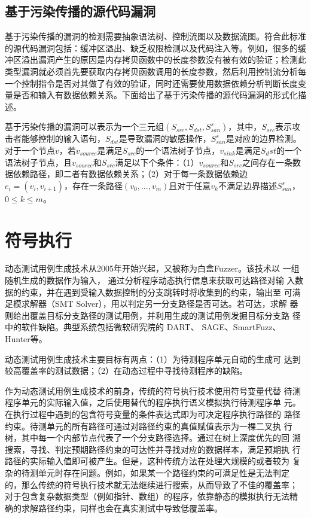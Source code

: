 \subsection{基于污染传播的源代码漏洞}

基于污染传播的漏洞的检测需要抽象语法树、控制流图以及数据流图。符合此标准的源代码漏洞包括：缓冲区溢出、缺乏权限检测以及代码注入等。例如，很多的缓冲区溢出漏洞产生的原因是内存拷贝函数中的长度参数没有被有效的验证；检测此类型漏洞就必须首先要获取内存拷贝函数调用的长度参数，然后利用控制流分析每一个控制指令是否对其做了有效的验证，同时还需要使用数据依赖分析判断长度变量是否和输入有数据依赖关系。下面给出了基于污染传播的源代码漏洞的形式化描述。

\begin{definition}
\label{基于污染传播的源代码漏洞描述}
基于污染传播的漏洞可以表示为一个三元组$(S_{src},S_{dst},S^{s}_{san})$，其中，$S_{src}$表示攻击者能够控制的输入语句，$S_{dst}$是导致漏洞的敏感操作，$S^{s}_{san}$是对应的边界检测。对于一个节点$v$，若$v_{source}$是满足$S_{src}$的一个语法树子节点，$v_{sink}$是满足$S_dst$的一个语法树子节点，且$v_{source}$和$S_{src}$满足以下个条件：（1）$v_{source}$和$S_{src}$之间存在一条数据依赖路径，即二者有数据依赖关系；（2）对于每一条数据依赖边$e_i = (v_i, v_{i+1})$，存在一条路径$(v_0,...,v_m)$且对于任意$v_k$不满足边界描述$S^{s}_{san}$，$0 \leq k \leq m$。
\end{definition}



\section{符号执行}
动态测试用例生成技术从2005年开始兴起，又被称为白盒Fuzzer。该技术以
一组随机生成的数据作为输入， 通过分析程序动态执行信息来获取可达路径对输
入数据的约束，并在遇到受输入数据控制的分支跳转时将收集到的约束，输出至
可满足模求解器（SMT Solver），用以判定另一分支路径是否可达。若可达，求解
器则给出覆盖目标分支路径的测试用例，并利用生成的测试用例发掘目标分支路
径中的软件缺陷。典型系统包括微软研究院的 DART、 SAGE、SmartFuzz、 Hunter等。

动态测试用例生成技术主要目标有两点：（1）为待测程序单元自动的生成可
达到较高覆盖率的测试数据；（2）在动态过程中寻找待测程序的缺陷。

作为动态测试用例生成技术的前身，传统的符号执行技术使用符号变量代替
待测程序单元的实际输入值，之后使用替代的程序执行语义模拟执行待测程序单
元。在执行过程中遇到的包含符号变量的条件表达式即为可决定程序执行路径的
路径约束。待测单元的所有路径可通过对路径约束的真值赋值表示为一棵二叉执
行树，其中每一个内部节点代表了一个分支路径选择。通过在树上深度优先的回
溯搜索，寻找、判定预期路径约束的可达性并寻找对应的数据样本，满足预期执
行路径的实际输入值即可被产生。但是，这种传统方法在处理大规模的或者较为
复杂的待测单元时存在问题。例如，如果某一个路径约束的可满足性是无法判定
的，那么传统的符号执行技术就无法继续进行搜索，从而导致了不佳的覆盖率；
对于包含复杂数据类型（例如指针、数组）的程序，依靠静态的模拟执行无法精
确的求解路径约束，同样也会在真实测试中导致低覆盖率。

